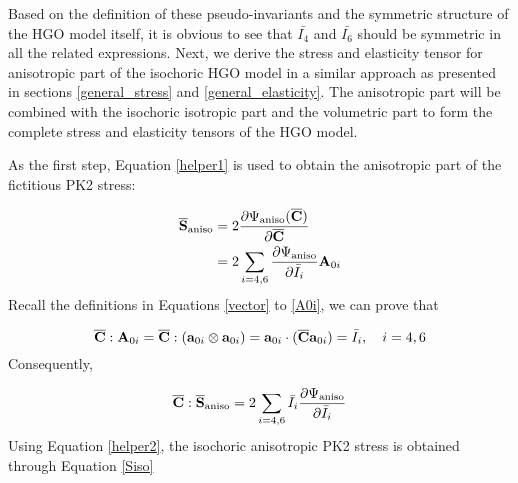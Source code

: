 Based on the definition of these pseudo-invariants and the symmetric structure of the HGO model itself, it is obvious to see that $\bar{I_4}$ and $\bar{I_6}$ should be symmetric in all the related expressions. Next, we derive the stress and elasticity tensor for anisotropic part of the isochoric HGO model in a similar approach as presented in sections \ref{general_stress} and \ref{general_elasticity}. The anisotropic part will be combined with the isochoric isotropic part and the volumetric part to form the complete stress and elasticity tensors of the HGO model.

As the first step, Equation \ref{helper1} is used to obtain the anisotropic part of the fictitious PK2 stress:

\begin{equation} \label{Sbar3}
\begin{split}
\overline{\bold{S}}_\mathrm{aniso} &=  2\frac{\partial\Psi_\mathrm{aniso}({\overline{\bold{C}})}}{\partial\overline{\bold{C}}} \\
&= 2\sum_{i = 4, 6}\frac{\partial{\Psi_\mathrm{aniso}}}{\partial{\bar{I}_i}}\bold{A}_{0i} 
\end{split}
\end{equation}
Recall the definitions in Equations \ref{vector} to \ref{A0i}, we can prove that

\begin{equation}
\overline{\bold{C}} : \bold{A}_{0i} = \overline{\bold{C}} : (\bold{a}_{0i} \otimes \bold{a}_{0i}) = \bold{a}_{0i} \cdot (\overline{\bold{C}} \bold{a}_{0i}) = \bar{I}_i, \quad i = 4, 6
\end{equation}
Consequently, 

\begin{equation} \label{helper2}
\overline{\bold{C}} : \overline{\bold{S}}_\mathrm{aniso} = 2\sum_{i = 4, 6} \bar{I}_i \frac{\partial{\Psi_\mathrm{aniso}}}{\partial{\bar{I}_i}}  
\end{equation}
Using Equation \ref{helper2}, the isochoric anisotropic PK2 stress is obtained through Equation \ref{Siso}

